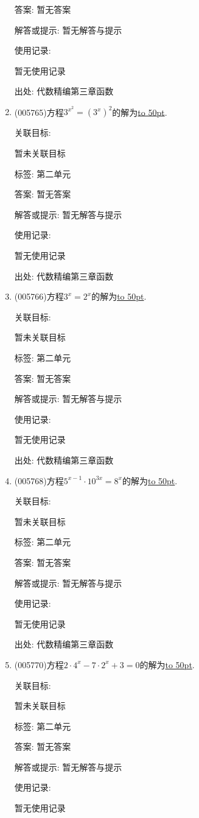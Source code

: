 \documentclass[10pt,a4paper]{article}
\newcommand{\blank}[1]{\underline{\hbox to #1pt{}}}
\begin{document}
\begin{enumerate}[1.]
答案: 暂无答案

解答或提示: 暂无解答与提示

使用记录:

暂无使用记录


出处: 代数精编第三章函数
\item { (005765)}方程$3^{x^2}=(3^x)^2$的解为\blank{50}.


关联目标:

暂未关联目标



标签: 第二单元

答案: 暂无答案

解答或提示: 暂无解答与提示

使用记录:

暂无使用记录


出处: 代数精编第三章函数
\item { (005766)}方程$3^x=2^x$的解为\blank{50}.


关联目标:

暂未关联目标



标签: 第二单元

答案: 暂无答案

解答或提示: 暂无解答与提示

使用记录:

暂无使用记录


出处: 代数精编第三章函数
\item { (005768)}方程$5^{x-1}\cdot 10^{3x}=8^x$的解为\blank{50}.


关联目标:

暂未关联目标



标签: 第二单元

答案: 暂无答案

解答或提示: 暂无解答与提示

使用记录:

暂无使用记录


出处: 代数精编第三章函数
\item { (005770)}方程$2\cdot 4^x-7\cdot 2^x+3=0$的解为\blank{50}.


关联目标:

暂未关联目标



标签: 第二单元

答案: 暂无答案

解答或提示: 暂无解答与提示

使用记录:

暂无使用记录



\end{enumerate}
\end{document}
